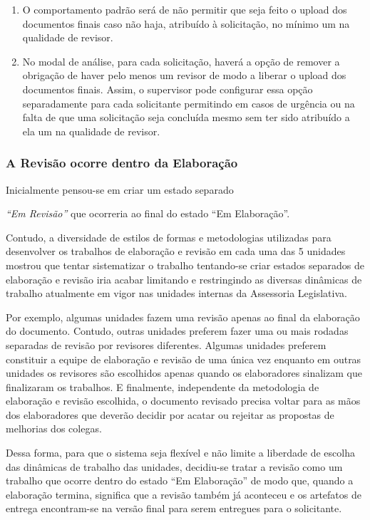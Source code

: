 \begin{enumerate}
	\item O comportamento padrão será de não permitir que seja feito o upload dos documentos finais caso não haja, atribuído à solicitação, no mínimo um \CL na qualidade de revisor.	
	
	\item No modal de análise, para cada solicitação, haverá a opção de \hypertarget{data250823mudanca1}{remover a obrigação de haver pelo menos um revisor de modo a liberar o upload dos documentos finais}. Assim, o supervisor pode configurar essa opção separadamente para cada solicitante permitindo em casos de urgência ou na falta de \CLs que uma solicitação seja concluída mesmo sem ter sido atribuído a ela um \CL na qualidade de revisor.
	
	
	
\end{enumerate}

\subsubsection{A Revisão ocorre dentro da Elaboração}

\hypertarget{data230823mudanca3}{Inicialmente pensou-se em criar um estado separado} \emph{``Em Revisão''} que ocorreria ao final do estado ``Em Elaboração''. 

Contudo, a diversidade de estilos de formas e metodologias utilizadas para desenvolver os trabalhos de elaboração e revisão em cada uma das 5 unidades mostrou que tentar sistematizar o trabalho tentando-se criar estados separados de elaboração e revisão iria acabar limitando e restringindo as diversas dinâmicas de trabalho atualmente em vigor nas unidades internas da Assessoria Legislativa.

Por exemplo, algumas unidades fazem uma revisão apenas ao final da elaboração do documento. Contudo, outras unidades preferem fazer uma ou mais rodadas separadas de revisão por revisores diferentes. Algumas unidades preferem constituir a equipe de elaboração e revisão de uma única vez enquanto em outras unidades os revisores são escolhidos apenas quando os elaboradores sinalizam que finalizaram os trabalhos. E finalmente, independente da metodologia de elaboração e revisão escolhida, o documento revisado precisa voltar para as mãos dos elaboradores que deverão decidir por acatar ou rejeitar as propostas de melhorias dos colegas.
 
Dessa forma, para que o sistema seja flexível e não limite a liberdade de escolha das dinâmicas de trabalho das unidades, decidiu-se tratar a revisão como um trabalho que ocorre dentro do estado ``Em Elaboração'' de modo que, quando a elaboração termina, significa que a revisão também já aconteceu e os artefatos de entrega encontram-se na versão final para serem entregues para o solicitante.

